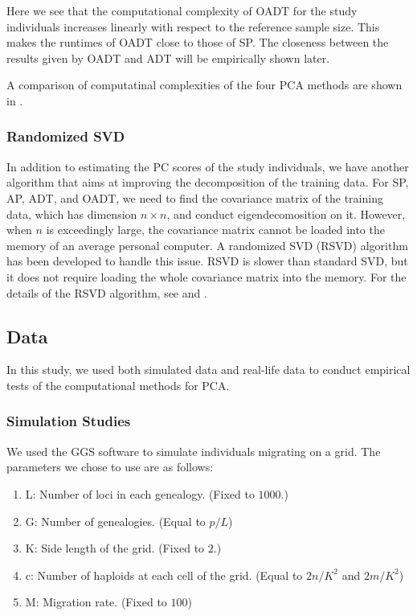 \documentclass{article}
\begin{document}
Here we see that the computational complexity of OADT for the study individuals increases linearly with respect to the reference sample size.
This makes the runtimes of OADT close to those of SP.
The closeness between the results given by OADT and ADT will be empirically shown later.

A comparison of computatinal complexities of the four PCA methods are shown in .

\subsubsection{Randomized SVD}
In addition to estimating the PC scores of the study individuals,
we have another algorithm that aims at improving the decomposition of the
training data.
For SP, AP, ADT, and OADT, we need to find the covariance matrix of the training
data, which has dimension $n \times n$, and conduct eigendecomosition on it.
However, when $n$ is exceedingly large,
the covariance matrix cannot be loaded into the memory of an average personal
computer.
A randomized SVD (RSVD) algorithm has been developed to handle this issue.
RSVD is slower than standard SVD,
but it does not require loading the whole covariance matrix into the memory.
For the details of the RSVD algorithm, see \cite{halko} and \cite{abraham}.



\subsection{Data}

In this study, we used both simulated data and real-life data to conduct
empirical tests of the computational methods for PCA.

\subsubsection{Simulation Studies}

We used the GGS software to simulate individuals migrating on a grid.
The parameters we chose to use are as follows:
\begin{enumerate}
\item L: Number of loci in each genealogy. (Fixed to $1000$.)
\item G: Number of genealogies. (Equal to $p / L$)
\item K: Side length of the grid. (Fixed to $2$.)
\item c: Number of haploids at each cell of the grid. (Equal to $2n / K^2$ and
$2m / K^2$)
\item M: Migration rate. (Fixed to $100$)
\end{enumerate}
\end{document}
